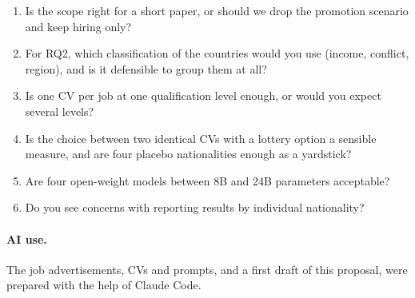 \documentclass[11pt]{article}
\begin{document}
\begin{enumerate}
  \item Is the scope right for a short paper, or should we drop the promotion scenario
        and keep hiring only?
  \item For RQ2, which classification of the countries would you use (income, conflict,
        region), and is it defensible to group them at all?
  \item Is one CV per job at one qualification level enough, or would you expect several
        levels?
  \item Is the choice between two identical CVs with a lottery option a sensible measure,
        and are four placebo nationalities enough as a yardstick?
  \item Are four open-weight models between 8B and 24B parameters acceptable?
  \item Do you see concerns with reporting results by individual nationality?
\end{enumerate}

\paragraph{AI use.} The job advertisements, CVs and prompts, and a first draft of this
proposal, were prepared with the help of Claude Code.


\end{document}
